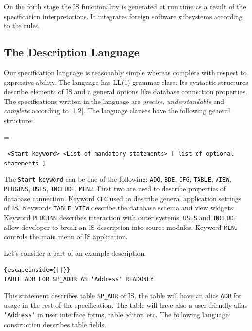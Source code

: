 \documentclass[conference]{IEEEtran}
\newcommand{\e}[2][fcolor]{\textcolor{pcolor}{[}\textcolor{#1}{#2}\textcolor{pcolor}{]}}
\newenvironment{asdcode}{\hangindent=\parindent\hangafter=1\par\noindent\small\tt}{}
\begin{document}
On the forth stage the IS functionality is generated at run time as a result of the specification interpretations.  It integrates foreign software subsystems according to the rules. %

\subsection{The Description Language}

Our specification language is reasonably simple whereas complete with respect to expressive ability.  The language has LL(1) grammar class.  Its syntactic structures describe elements of IS and a general options like database connection properties.  The specifications written in the language are \emph{precise}, \emph{understandable} and \emph{complete} according to [1,2].  The language clauses have the following general structure:

\begin{asdcode}%
<Start keyword> <List of mandatory statements> [~list of optional statements~]
\end{asdcode}

The \texttt{Start keyword} can be one of the following: \texttt{ADO}, \texttt{BDE}, \texttt{CFG}, \texttt{TABLE}, \texttt{VIEW}, \texttt{PLUGINS}, \texttt{USES}, \texttt{INCLUDE}, \texttt{MENU}.  First two are used to describe properties of database connection.  Keyword \texttt{CFG} used to describe general application settings of IS.  Keywords \texttt{TABLE}, \texttt{VIEW} describe the database schema and view widgets.  Keyword \texttt{PLUGINS} describes interaction with outer systems; \texttt{USES} and \texttt{INCLUDE} allow developer to break an IS description into source modules.  Keyword \texttt{MENU} controls the main menu of IS application.

Let's consider a part of an example description.

\begin{lstlisting}{escapeinside={||}}
TABLE ADR FOR SP_ADDR AS 'Address' READONLY
\end{lstlisting}%

This statement describes table \texttt{SP\_ADR} of IS, the table will have an alias \texttt{ADR} for usage in the rest of the specification.  The table will have also a user-friendly alias \texttt{'Address'} in user interface forms, table editor, etc.  The following language construction describes table fields.
\end{document}
